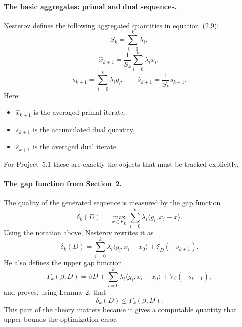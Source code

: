 \documentclass[12pt,a4paper]{article}
\begin{document}
\paragraph{The basic aggregates: primal and dual sequences.}
Nesterov defines the following aggregated quantities in equation~(2.9):
\begin{equation}
    S_k = \sum_{i=0}^k \lambda_i,
\end{equation}
\begin{equation}
    \hat{x}_{k+1} = \frac{1}{S_k}\sum_{i=0}^k \lambda_i x_i,
\end{equation}
\begin{equation}
    s_{k+1} = \sum_{i=0}^k \lambda_i g_i,
    \qquad
    \hat{s}_{k+1} = \frac{1}{S_k}s_{k+1}.
\end{equation}
Here:
\begin{itemize}[leftmargin=1.2cm]
    \item $\hat{x}_{k+1}$ is the averaged primal iterate,
    \item $s_{k+1}$ is the accumulated dual quantity,
    \item $\hat{s}_{k+1}$ is the averaged dual iterate.
\end{itemize}
For Project~5.1 these are exactly the objects that must be tracked explicitly.

\paragraph{The gap function from Section~2.}
The quality of the generated sequence is measured by the gap function
\begin{equation}
    \delta_k(D)
    =
    \max_{x \in F_D}
    \sum_{i=0}^k \lambda_i \langle g_i, x_i - x \rangle.
\end{equation}
Using the notation above, Nesterov rewrites it as
\begin{equation}
    \delta_k(D)
    =
    \sum_{i=0}^k \lambda_i \langle g_i, x_i - x_0 \rangle + \xi_D(-s_{k+1}).
\end{equation}
He also defines the upper gap function
\begin{equation}
    \Gamma_k(\beta,D)
    =
    \beta D + \sum_{i=0}^k \lambda_i \langle g_i, x_i - x_0 \rangle + V_\beta(-s_{k+1}),
\end{equation}
and proves, using Lemma~2, that
\begin{equation}
    \delta_k(D) \le \Gamma_k(\beta,D).
\end{equation}
This part of the theory matters because it gives a computable quantity that upper-bounds the optimization error.
\end{document}
